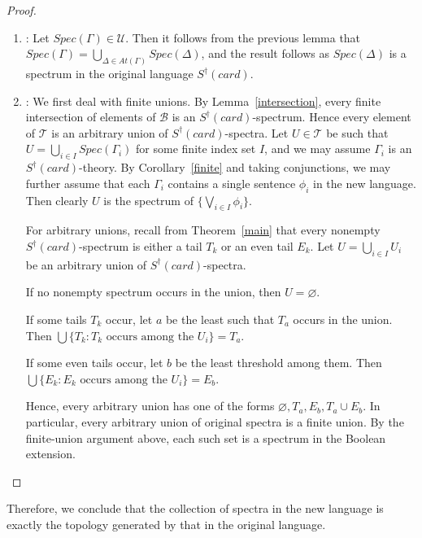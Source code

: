 \documentclass[12pt, reqno]{amsart}
\theoremstyle{definition}
\theoremstyle{remark}
\numberwithin{equation}{section}
\begin{document}
\begin{proof}
	\begin{enumerate}
	\item[$\mathcal{U} \subseteq \mathcal{T}$]: 
	Let $Spec(\Gamma) \in \mathcal{U}$. Then it follows from the previous lemma that $Spec(\Gamma) = \bigcup_{\Delta \in At(\Gamma)} Spec(\Delta)$, and the result follows as $Spec(\Delta)$ is a spectrum in the original language $S^{\dagger}(card)$. 

	\item[$\mathcal{T} \subseteq \mathcal{U}$]:
	We first deal with finite unions. By Lemma~\ref{intersection}, every finite intersection of elements of $\mathcal B$ is an $S^\dagger(card)$-spectrum. Hence every element of $\mathcal T$ is an arbitrary union of $S^\dagger(card)$-spectra. Let $U \in \mathcal{T}$ be such that $U = \bigcup_{i \in I} Spec(\Gamma_{i})$ for some finite index set $I$, and we may assume $\Gamma_{i}$ is an $S^{\dagger}(card)$-theory. By Corollary~\ref{finite} and taking conjunctions, we may further assume that each $\Gamma_{i}$ contains a single sentence $\phi_i$ in the new language. Then clearly $U$ is the spectrum of $\{\bigvee_{i \in I} \phi_i\}$. 

	For arbitrary unions, recall from Theorem~\ref{main} that every nonempty $S^\dagger(card)$-spectrum is either a tail $T_k$ or an even tail $E_k$. Let $U=\bigcup_{i\in I}U_i$ be an arbitrary union of $S^\dagger(card)$-spectra.

	If no nonempty spectrum occurs in the union, then $U=\varnothing$.

	If some tails $T_k$ occur, let $a$ be the least such that $T_a$ occurs in the union. Then $\bigcup\{T_k:T_k\text{ occurs among the }U_i\}=T_a.$ 

	If some even tails occur, let $b$ be the least threshold among them. Then $\bigcup\{E_k:E_k\text{ occurs among the }U_i\}=E_b.$ 

	Hence, every arbitrary union has one of the forms $\varnothing, T_a, E_b, T_a\cup E_b.$ In particular, every arbitrary union of original spectra is a finite union. By the finite-union argument above, each such set is a spectrum in the Boolean extension.



	\end{enumerate}
\end{proof}

Therefore, we conclude that the collection of spectra in the new language is exactly the topology generated by that in the original language. 
\end{document}
